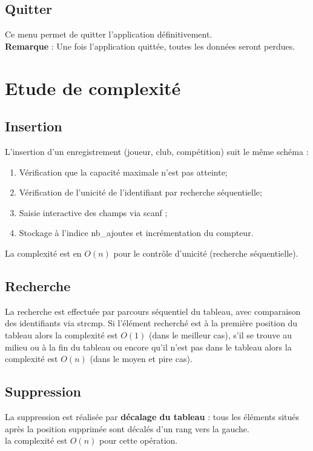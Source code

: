 \documentclass[12pt,a4paper]{report}
\begin{document}
\section{Quitter}
Ce menu permet de quitter l'application définitivement.\\

\textbf{Remarque} : Une fois l'application quittée, toutes les données seront perdues.

\chapter{Etude de complexité} 
\section{Insertion}
L'insertion d'un enregistrement (joueur, club, compétition) suit le même schéma : \\
\begin{enumerate}
	\item Vérification que la capacité maximale n'est pas atteinte; 
	\item Vérification de l'unicité de l'identifiant par recherche séquentielle;
	\item Saisie interactive des champs via scanf ;
	\item Stockage à l'indice nb\_ajoutes et incrémentation du compteur.
\end{enumerate}
	La complexité est en $O(n)$ pour le contrôle d'unicité (recherche séquentielle).

 

\section{Recherche}
La recherche est effectuée par parcours séquentiel du tableau, avec comparaison des identifiants via strcmp. Si l'élément recherché est à la première position du tableau alors la complexité est $O(1)$ (dans le meilleur cas), s'il se trouve au milieu ou à la fin du tableau ou encore qu'il n'est pas dans le tableau alors la complexité est $O(n)$ (dans le moyen et pire cas).

\section{Suppression}
La suppression est réalisée par \textbf{décalage du tableau} : tous les éléments situés après la position supprimée sont décalés d'un rang vers la gauche.\\
la complexité est $O(n)$ pour cette opération.
\end{document}
